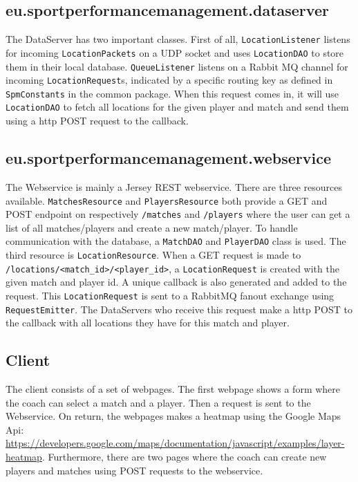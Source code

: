 \subsection{eu.sportperformancemanagement.dataserver}
The DataServer has two important classes. First of all, \texttt{LocationListener} listens for incoming \texttt{LocationPackets} on a UDP socket and uses \texttt{LocationDAO} to store them in their local database. \texttt{QueueListener} listens on a Rabbit MQ channel for incoming \texttt{LocationRequest}s, indicated by a specific routing key as defined in \texttt{SpmConstants} in the common package. When this request comes in, it will use \texttt{LocationDAO} to fetch all locations for the given player and match and send them using a http POST request to the callback. 

\subsection{eu.sportperformancemanagement.webservice}
The Webservice is mainly a Jersey REST webservice. There are three resources available. \texttt{MatchesResource} and \texttt{PlayersResource} both provide a GET and POST endpoint on respectively \texttt{/matches} and \texttt{/players} where the user can get a list of all matches/players and create a new match/player. To handle communication with the database, a \texttt{MatchDAO} and \texttt{PlayerDAO} class is used. The third resource is \texttt{LocationResource}. When a GET request is made to \texttt{/locations/<match\_id>/<player\_id>}, a \texttt{LocationRequest} is created with the given match and player id. A unique callback is also generated and added to the request. This \texttt{LocationRequest} is sent to a RabbitMQ fanout exchange using \texttt{RequestEmitter}. The DataServers who receive this request make a http POST to the callback with all locations they have for this match and player.

\subsection{Client}
The client consists of a set of webpages. The first webpage shows a form where the coach can select a match and a player. Then a request is sent to the Webservice. On return, the webpages makes a heatmap using the Google Maps Api: \url{https://developers.google.com/maps/documentation/javascript/examples/layer-heatmap}. Furthermore, there are two pages where the coach can create new players and matches using POST requests to the webservice.


